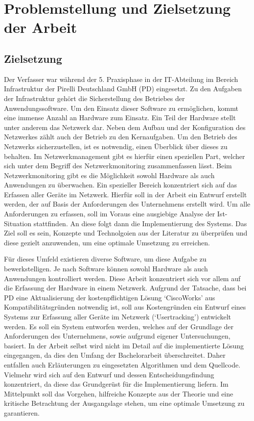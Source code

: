 \chapter{Problemstellung und Zielsetzung der Arbeit}
\label{cha:Einleitung}

\section{Zielsetzung}

Der Verfasser war während der 5. Praxisphase in der IT-Abteilung im Bereich Infrastruktur der Pirelli Deutschland GmbH (PD) eingesetzt.
Zu den Aufgaben der Infrastruktur gehört die Sicherstellung des Betriebes der Anwendungssoftware.
Um den Einsatz dieser Software zu ermöglichen, kommt eine immense Anzahl an Hardware zum Einsatz.
Ein Teil der Hardware stellt unter anderem das Netzwerk dar.
Neben dem Aufbau und der Konfiguration des Netzwerkes zählt auch der Betrieb zu den Kernaufgaben.
Um den Betrieb des Netzwerks sicherzustellen, ist es notwendig, einen Überblick über dieses zu behalten.
Im Netzwerkmanagement gibt es hierfür einen speziellen Part, welcher sich unter dem Begriff des Netzwerkmonitoring zusammenfassen lässt.
Beim Netzwerkmonitoring gibt es die Möglichkeit sowohl Hardware als auch Anwendungen zu überwachen.
Ein spezieller Bereich konzentriert sich auf das Erfassen aller Geräte im Netzwerk.
Hierfür soll in der Arbeit ein Entwurf erstellt werden, der auf Basis der Anforderungen des Unternehmens erstellt wird.
Um alle Anforderungen zu erfassen, soll im Voraus eine ausgiebige Analyse der Ist-Situation stattfinden.
An diese folgt dann die Implementierung des Systems.
Das Ziel soll es sein, Konzepte und Technolgoien aus der Literatur zu überprüfen und diese gezielt anzuwenden, um eine optimale Umsetzung zu erreichen. 

Für dieses Umfeld existieren diverse Software, um diese Aufgabe zu bewerkstelligen.
Je nach Software können sowohl Hardware als auch Anwendungen kontrolliert werden.
Diese Arbeit konzentriert sich vor allem auf die Erfassung der Hardware in einem Netzwerk.
Aufgrund der Tatsache, dass bei PD eine Aktualisierung der kostenpflichtigen Lösung ‘CiscoWorks’ aus Kompatibilitätsgründen notwendig ist, soll aus Kostengründen ein Entwurf eines Systems zur Erfassung aller Geräte im Netzwerk (‘Usertracking’) entwickelt werden.
Es soll ein System entworfen werden, welches auf der Grundlage der Anforderungen des Unternehmens, sowie aufgrund eigener Untersuchungen, basiert.
In der Arbeit selbst wird nicht im Detail auf die implementierte Lösung eingegangen, da dies den Umfang der Bachelorarbeit überschreitet.
Daher entfallen auch Erläuterungen zu eingesetzten Algorithmen und dem Quellcode.
Vielmehr wird sich auf den Entwurf und dessen Entscheidungsfindung konzentriert, da diese das Grundgerüst für die Implementierung liefern.
Im Mittelpunkt soll das Vorgehen, hilfreiche Konzepte aus der Theorie und eine kritische Betrachtung der Ausgangslage stehen, um eine optimale Umsetzung zu garantieren.\\

